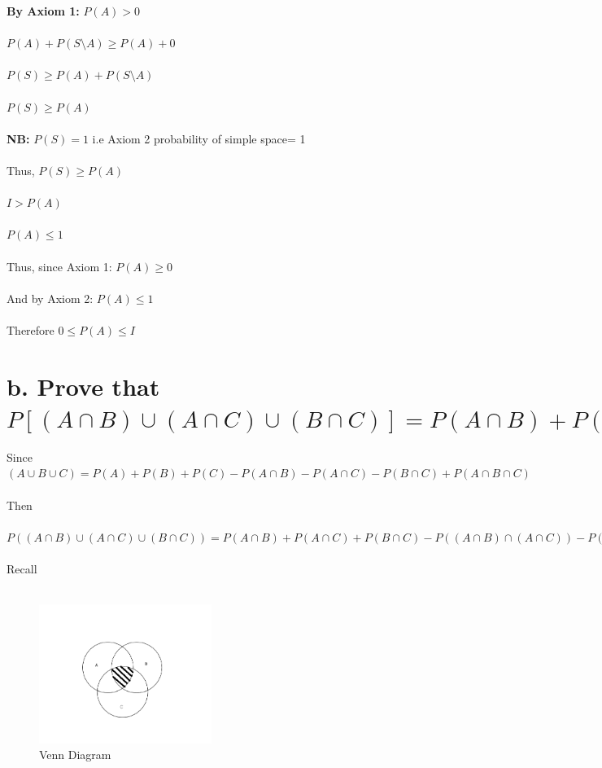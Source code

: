 \documentclass{article}
\begin{document}
\textbf{By Axiom 1:} $P(A) > 0$ \\ \\
$P(A) + P(S \setminus A) \geq P(A) + 0$
\\ \\
$P(S) \geq P(A) + P(S \setminus A)$
\\ \\
$P(S) \geq P(A)$
\\ \\
\textbf{NB:} $P(S) = 1$ { i.e Axiom 2 {probability of simple space= 1}}
\\ \\
Thus, $P(S) \geq P(A)$
\\ \\
$I > P(A)$
\\ \\
$P(A) \leq 1$
\\ \\
Thus, since Axiom 1: $P(A) \geq 0$
\\ \\
And by Axiom 2: $P(A) \leq 1$
\\ \\
Therefore $0 \leq P(A) \leq I$\\

\newpage
\section*{b. Prove that $P[(A \cap B) \cup (A \cap C) \cup (B \cap C)] = P(A \cap B) + P(A \cap C) + P(B \cap C) - 2P(A \cap B \cap C)$}

Since $(A \cup B \cup C) = P(A) + P(B) + P(C) - P(A \cap B) - P(A \cap C) - P(B \cap C) + P(A \cap B \cap C)$
\\ \\
Then
\\ \\ 
$P((A \cap B) \cup (A \cap C) \cup (B \cap C)) = P(A \cap B) + P(A \cap C) + P(B \cap C) - P((A \cap B) \cap (A \cap C)) - P((A \cap B) \cap (B \cap C)) - P(A \cap C \cap B \cap C) + P((A \cap B) \cap (A \cap C) \cap (B \cap C))$
\\ \\

Recall
\\ \\ 

\begin{figure}[H]
    \centering
    \includegraphics[width=0.5\textwidth]{latexvenn.png}
    \caption{Venn Diagram}
    \label{fig:my_label}
\end{figure}
\end{document}
